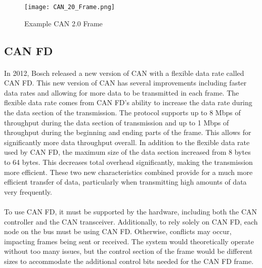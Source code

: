 \begin{figure}[H]
	\centering
	\texttt{[image: CAN\_20\_Frame.png]}
	\caption{Example CAN 2.0 Frame \cite{wikipediaCAN}}
	\label{fig:CANDataFrame}
\end{figure}

\subsection{CAN FD}

\paragraph{}
In 2012, Bosch released a new version of CAN with a flexible data rate called CAN FD\cite{BOSCH_CANFD}.
This new version of CAN has several improvements including faster data rates and allowing for more data to be transmitted in each frame.
The flexible data rate comes from CAN FD's ability to increase the data rate during the data section of the transmission.
The protocol supports up to 8 Mbps of throughput during the data section of transmission and up to 1 Mbps of throughput during the beginning and ending parts of the frame.
This allows for significantly more data throughput overall.
In addition to the flexible data rate used by CAN FD, the maximum size of the data section increased from 8 bytes to 64 bytes.
This decreases total overhead significantly, making the transmission more efficient.
These two new characteristics combined provide for a much more efficient transfer of data, particularly when transmitting high amounts of data very frequently.

\paragraph{}
To use CAN FD, it must be supported by the hardware, including both the CAN controller and the CAN transceiver.
Additionally, to rely solely on CAN FD, each node on the bus must be using CAN FD.
Otherwise, conflicts may occur, impacting frames being sent or received.
The system would theoretically operate without too many issues, but the control section of the frame would be different sizes to accommodate the additional control bits needed for the CAN FD frame.